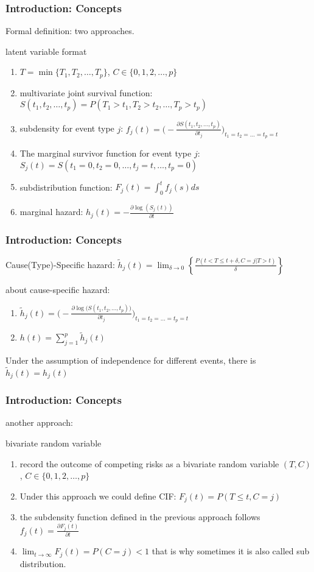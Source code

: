\documentclass{beamer}[10]
\begin{document}
\begin{frame}
	\frametitle{Introduction: Concepts}
	Formal definition: two approaches.
	\begin{block}{latent variable format}
		\begin{enumerate}
			\item $T = \min\{T_1, T_2, \ldots, T_p\}$, $C \in \{0, 1, 2, \ldots, p\}$
			\item multivariate joint survival function: $S(t_1, t_2, \ldots, t_p) = P(T_1 > t_1, T_2 > t_2, \ldots, T_p > t_p)$
			\item subdensity for event type $j$: $f_j(t) = \Big(-\frac{\partial S(t_1, t_2, \ldots, t_p)}{\partial t_j}\Big)_{t_1 = t_2 = \ldots = t_p = t}$
			\item The marginal survivor function for event type $j$: $S_j(t) = S(t_1 = 0, t_2 = 0, \ldots, t_j = t, \ldots, t_p = 0)$
			\item subdistribution function: $F_j(t) = \int_0^t f_j(s)d s$
			\item marginal hazard: $h_j(t) = -\frac{\partial \log(S_j(t))}{\partial t}$
		\end{enumerate}
	\end{block}
\end{frame}
\begin{frame}
	\frametitle{Introduction: Concepts}
	Cause(Type)-Specific hazard:
	$\tilde{h}_j(t) = \lim_{\delta \to 0}\left\{\frac{P(t < T \leq t + \delta, C = j|T> t)}{\delta}\right\}$
	\begin{block}{about cause-specific hazard:}
		\begin{enumerate}
			\item $\tilde{h}_j(t) = \Big(-\frac{\partial \log\Big(S(t_1, t_2, \ldots, t_p)\Big)}{\partial t_j}\Big)_{t_1 = t_2 = \ldots = t_p = t}$
			\item $h(t) = \sum_{j = 1}^p\tilde{h}_j(t)$
		\end{enumerate}
	\end{block}
	Under the assumption of independence for different events, there is $\tilde{h}_j(t) = h_j(t)$
\end{frame}
\begin{frame}
	\frametitle{Introduction: Concepts}
	another approach:
	\begin{block}{bivariate random variable}
		\begin{enumerate}
			\item  record the outcome of competing risks as a bivariate random variable $(T, C)$, $C \in \{0, 1, 2, \ldots, p\}$
			\item Under this approach we could define CIF:  $F_j(t) = P(T \leq t, C = j)$
			\item the subdensity function defined in the previous approach follows $f_j(t) = \frac{\partial F_j(t)}{\partial t} $
			\item $\lim_{t \to \infty}F_j(t) = P(C = j) < 1$ that is why sometimes it is also called sub distribution.
		\end{enumerate}
	\end{block}
\end{frame}
\end{document}
